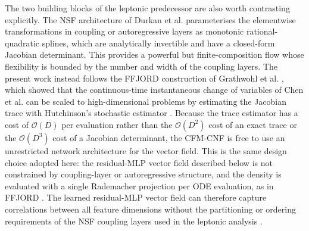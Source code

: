 \documentclass[11pt,a4paper,twocolumn]{article}
\begin{document}
The two building blocks of the leptonic predecessor are also worth
contrasting explicitly. The NSF architecture of Durkan et al.
\cite{durkan_nsf} parameterises the elementwise transformations in coupling
or autoregressive layers as monotonic rational-quadratic splines, which are
analytically invertible and have a closed-form Jacobian determinant. This
provides a powerful but finite-composition flow whose flexibility is
bounded by the number and width of the coupling layers. The present work
instead follows the FFJORD construction of Grathwohl et al.
\cite{grathwohl_ffjord}, which showed that the continuous-time
instantaneous change of variables of Chen et al. \cite{chen_neural_ode}
can be scaled to high-dimensional problems by estimating the Jacobian trace
with Hutchinson's stochastic estimator \cite{grathwohl_ffjord}. Because the
trace estimator has a cost of $\mathcal{O}(D)$ per evaluation rather than
the $\mathcal{O}(D^2)$ cost of an exact trace or the $\mathcal{O}(D^3)$
cost of a Jacobian determinant, the CFM-CNF is free to use an unrestricted
network architecture for the vector field. This is the same design choice
adopted here: the residual-MLP vector field described below is not
constrained by coupling-layer or autoregressive structure, and the density
is evaluated with a single Rademacher projection per ODE evaluation, as in
FFJORD \cite{grathwohl_ffjord}. The learned residual-MLP vector field can
therefore capture correlations between all feature dimensions without the
partitioning or ordering requirements of the NSF coupling layers used in
the leptonic analysis \cite{durkan_nsf,rasineni_nsf_monoz}.
\end{document}
